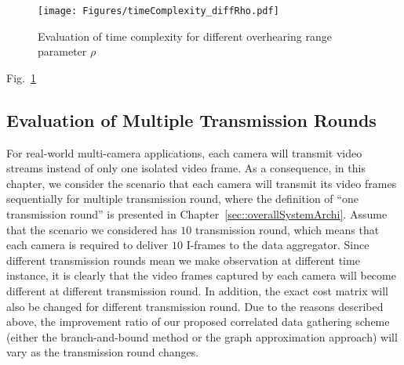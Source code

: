 \begin{figure}
\begin{center}
\texttt{[image: Figures/timeComplexity\_diffRho.pdf]}
\caption{\label{fig::evaComplexity_DiffRange}Evaluation of time complexity for different overhearing range parameter $\rho$}
\end{center}
\end{figure}
Fig.~\ref{fig::evaComplexity_DiffRange}

\subsection{Evaluation of Multiple Transmission Rounds}
%
For real-world multi-camera applications, each camera will transmit video streams instead of only one isolated video frame.
As a consequence, in this chapter, we consider the scenario that each camera will transmit its video frames sequentially for multiple transmission round, where the definition of ``one transmission round'' is presented in Chapter~\ref{sec::overallSystemArchi}.
Assume that the scenario we considered has $10$ transmission round, which means that each camera is required to deliver $10$ I-frames to the data aggregator.
Since different transmission rounds mean we make observation at different time instance, it is clearly that the video frames captured by each camera will become different at different transmission round.
In addition, the exact cost matrix will also be changed for different transmission round.
Due to the reasons described above, the improvement ratio of our proposed correlated data gathering scheme (either the branch-and-bound method or the graph approximation approach) will vary as the transmission round changes.

